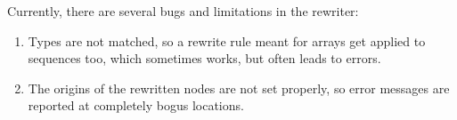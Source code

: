 \documentclass{report}
\begin{document}
Currently, there are several bugs and limitations in the rewriter:
\begin{enumerate}
\item Types are not matched, so a rewrite rule meant for arrays get applied to sequences too,
which sometimes works, but often leads to errors.
\item The origins of the rewritten nodes are not set properly, so error messages are
reported at completely bogus locations.
\end{enumerate}

%
%

\appendix


\end{document}

